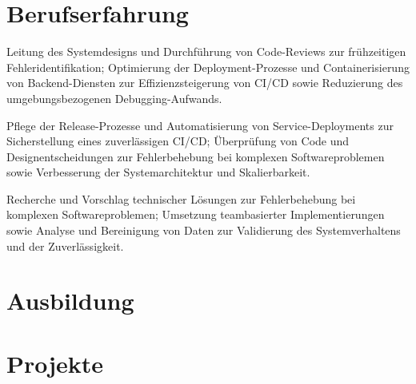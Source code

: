 \documentclass[11pt,a4paper]{resume}
\begin{document}
\section{Berufserfahrung}

\bullets
  \item Leitung des Systemdesigns und Durchführung von Code-Reviews zur frühzeitigen Fehleridentifikation; Optimierung der Deployment-Prozesse und Containerisierung von Backend-Diensten zur Effizienzsteigerung von CI/CD sowie Reduzierung des umgebungsbezogenen Debugging-Aufwands.
\bulletsend
\vspace{3pt}
\bullets
  \item Pflege der Release-Prozesse und Automatisierung von Service-Deployments zur Sicherstellung eines zuverlässigen CI/CD; Überprüfung von Code und Designentscheidungen zur Fehlerbehebung bei komplexen Softwareproblemen sowie Verbesserung der Systemarchitektur und Skalierbarkeit.
\bulletsend
\vspace{3pt}
\bullets
  \item Recherche und Vorschlag technischer Lösungen zur Fehlerbehebung bei komplexen Softwareproblemen; Umsetzung teambasierter Implementierungen sowie Analyse und Bereinigung von Daten zur Validierung des Systemverhaltens und der Zuverlässigkeit.
\bulletsend
\vspace{3pt}

\section{Ausbildung}

\vspace{2pt}

\section{Projekte}
\end{document}

